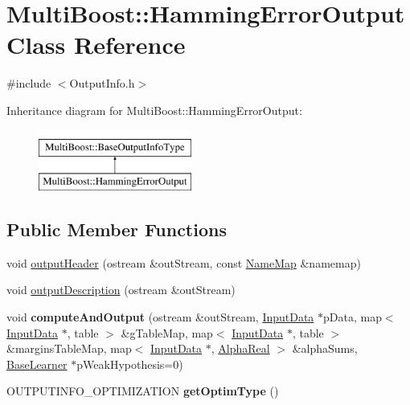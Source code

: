 \hypertarget{classMultiBoost_1_1HammingErrorOutput}{\section{Multi\-Boost\-:\-:Hamming\-Error\-Output Class Reference}
\label{classMultiBoost_1_1HammingErrorOutput}
}


{\ttfamily \#include $<$Output\-Info.\-h$>$}

Inheritance diagram for Multi\-Boost\-:\-:Hamming\-Error\-Output\-:\begin{figure}[H]
\begin{center}
\leavevmode
\includegraphics[height=2.000000cm]{classMultiBoost_1_1HammingErrorOutput}
\end{center}
\end{figure}
\subsection*{Public Member Functions}
\begin{DoxyCompactItemize}
\item 
void \hyperlink{classMultiBoost_1_1HammingErrorOutput_ae5cb9388a296ca15feedcf79ef002466}{output\-Header} (ostream \&out\-Stream, const \hyperlink{classMultiBoost_1_1NameMap}{Name\-Map} \&namemap)
\item 
void \hyperlink{classMultiBoost_1_1HammingErrorOutput_af51438a81864b9512648621e993571fb}{output\-Description} (ostream \&out\-Stream)
\item 
\hypertarget{classMultiBoost_1_1HammingErrorOutput_aea6f217c5c536064f037e68c2a7c1c5c}{void {\bfseries compute\-And\-Output} (ostream \&out\-Stream, \hyperlink{classMultiBoost_1_1InputData}{Input\-Data} $\ast$p\-Data, map$<$ \hyperlink{classMultiBoost_1_1InputData}{Input\-Data} $\ast$, table $>$ \&g\-Table\-Map, map$<$ \hyperlink{classMultiBoost_1_1InputData}{Input\-Data} $\ast$, table $>$ \&margins\-Table\-Map, map$<$ \hyperlink{classMultiBoost_1_1InputData}{Input\-Data} $\ast$, \hyperlink{Defaults_8h_a80184c4fd10ab70a1a17c5f97dcd1563}{Alpha\-Real} $>$ \&alpha\-Sums, \hyperlink{classMultiBoost_1_1BaseLearner}{Base\-Learner} $\ast$p\-Weak\-Hypothesis=0)}\label{classMultiBoost_1_1HammingErrorOutput_aea6f217c5c536064f037e68c2a7c1c5c}

\item 
\hypertarget{classMultiBoost_1_1HammingErrorOutput_a8dc9084ec04c35658ade7ab47326cb93}{O\-U\-T\-P\-U\-T\-I\-N\-F\-O\-\_\-\-O\-P\-T\-I\-M\-I\-Z\-A\-T\-I\-O\-N {\bfseries get\-Optim\-Type} ()}\label{classMultiBoost_1_1HammingErrorOutput_a8dc9084ec04c35658ade7ab47326cb93}

\end{DoxyCompactItemize}
